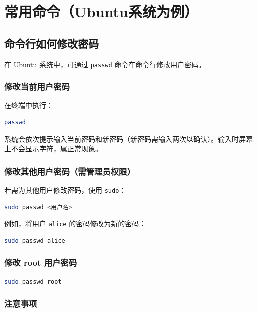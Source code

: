 \chapter{常用命令（Ubuntu系统为例）}

\section{命令行如何修改密码}

在 Ubuntu 系统中，可通过 \texttt{passwd} 命令在命令行修改用户密码。

\subsection{修改当前用户密码}

在终端中执行：

\begin{lstlisting}[language=sh]
passwd
\end{lstlisting}

系统会依次提示输入当前密码和新密码（新密码需输入两次以确认）。输入时屏幕上不会显示字符，属正常现象。

\subsection{修改其他用户密码（需管理员权限）}

若需为其他用户修改密码，使用 \texttt{sudo}：

\begin{lstlisting}[language=sh]
sudo passwd <用户名>
\end{lstlisting}

例如，将用户 \texttt{alice} 的密码修改为新的密码：

\begin{lstlisting}[language=sh]
sudo passwd alice
\end{lstlisting}

\subsection{修改 root 用户密码}

\begin{lstlisting}[language=sh]
sudo passwd root
\end{lstlisting}

\subsection{注意事项}

